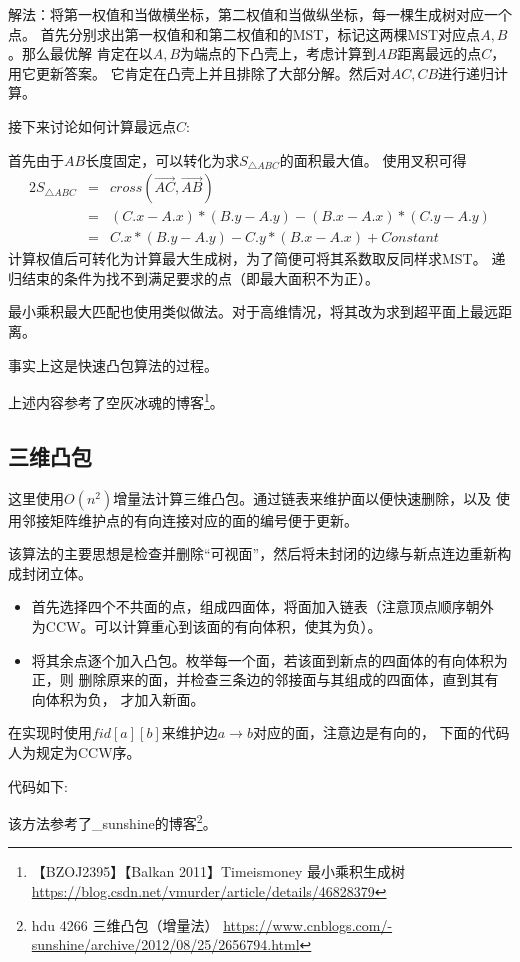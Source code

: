 解法：将第一权值和当做横坐标，第二权值和当做纵坐标，每一棵生成树对应一个点。
首先分别求出第一权值和和第二权值和的MST，标记这两棵MST对应点$A,B$。那么最优解
肯定在以$A,B$为端点的下凸壳上，考虑计算到$AB$距离最远的点$C$，用它更新答案。
它肯定在凸壳上并且排除了大部分解。然后对$AC,CB$进行递归计算。

接下来讨论如何计算最远点$C$:

首先由于$AB$长度固定，可以转化为求$S_{\triangle ABC}$的面积最大值。
使用叉积可得
\begin{eqnarray*}
	2S_{\triangle ABC}&=&cross(\overrightarrow{AC},\overrightarrow{AB})\\
	&=&(C.x-A.x)*(B.y-A.y)-(B.x-A.x)*(C.y-A.y)\\
	&=&C.x*(B.y-A.y)-C.y*(B.x-A.x)+Constant
\end{eqnarray*}
计算权值后可转化为计算最大生成树，为了简便可将其系数取反同样求MST。
递归结束的条件为找不到满足要求的点（即最大面积不为正）。

最小乘积最大匹配也使用类似做法。对于高维情况，将其改为求到超平面上最远距离。

事实上这是快速凸包算法的过程。

上述内容参考了空灰冰魂的博客\footnote{
	【BZOJ2395】【Balkan 2011】Timeismoney 最小乘积生成树
	\url{https://blog.csdn.net/vmurder/article/details/46828379}
}。
\subsection{三维凸包}
这里使用$O(n^2)$增量法计算三维凸包。通过链表来维护面以便快速删除，以及
使用邻接矩阵维护点的有向连接对应的面的编号便于更新。

该算法的主要思想是检查并删除``可视面''，然后将未封闭的边缘与新点连边重新构成封闭立体。
\begin{itemize}
	\item 首先选择四个不共面的点，组成四面体，将面加入链表（注意顶点顺序朝外
	      为CCW。可以计算重心到该面的有向体积，使其为负）。
	\item 将其余点逐个加入凸包。枚举每一个面，若该面到新点的四面体的有向体积为正，则
	      删除原来的面，并检查三条边的邻接面与其组成的四面体，直到其有向体积为负，
	      才加入新面。
\end{itemize}

在实现时使用$fid[a][b]$来维护边$a\rightarrow b$对应的面，注意边是有向的，
下面的代码人为规定为CCW序。

代码如下:


该方法参考了\_sunshine的博客\footnote{
	hdu 4266 三维凸包（增量法）
	\url{https://www.cnblogs.com/-sunshine/archive/2012/08/25/2656794.html}
}。
